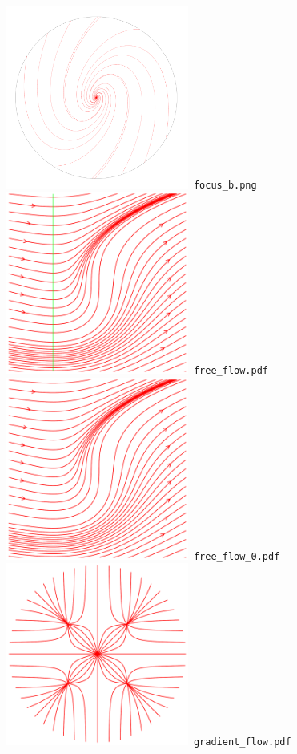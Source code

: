\documentclass[a4paper]{amsart}
\begin{document}
\includegraphics[width=6cm]{focus_b.png}\verb+ focus_b.png+\\
\includegraphics[width=6cm]{free_flow.pdf}\verb+ free_flow.pdf+\\
\includegraphics[width=6cm]{free_flow_0.pdf}\verb+ free_flow_0.pdf+\\
\includegraphics[width=6cm]{gradient_flow.pdf}\verb+ gradient_flow.pdf+\\
\end{document}
